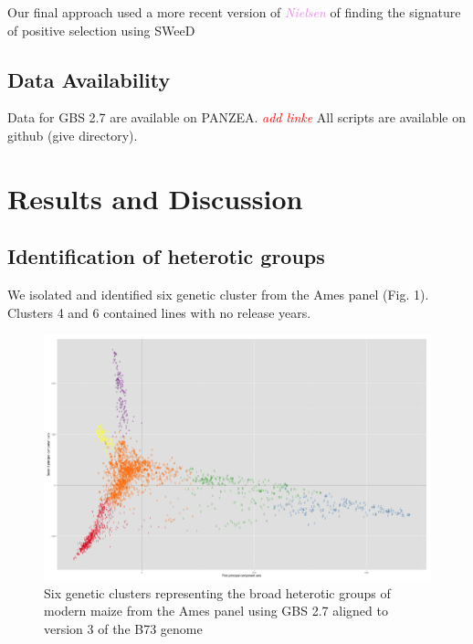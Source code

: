 \documentclass[9pt,twocolumn,twoside]{gsajnl}
\newcommand{\jri}[1]{\textcolor{red}{ \emph{ #1}} }
\newcommand{\kc}[1]{\textcolor{violet}{ \emph{ #1}} }
\begin{document}
Our final approach used a more recent version of \kc{Nielsen} of finding the signature of positive selection using SWeeD

\subsection*{Data Availability}

Data for GBS 2.7 are available on PANZEA.\jri{add linke} All scripts are available on github (give directory).




\section*{Results and Discussion}

\subsection{Identification of heterotic groups}
We isolated and identified six genetic cluster from the Ames panel (Fig. 1). Clusters 4 and 6 contained lines with no release years.
\begin{figure}[htbp]
\centering
\includegraphics[width=\linewidth]{6_clusters_placeholder.png}
\caption{Six genetic clusters representing the broad heterotic groups of modern maize from the Ames panel using GBS 2.7 aligned to version 3 of the B73 genome 
}
\label{fig:6clusters}
\end{figure}
\end{document}
